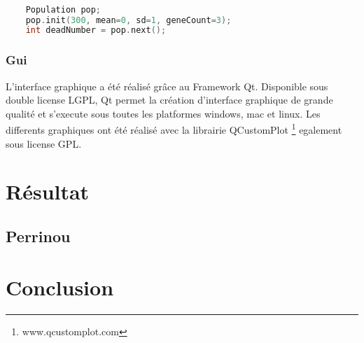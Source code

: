 \documentclass{article}
\begin{document}
	\begin{lstlisting}[language=C++, caption=Generation d'une population et basculement vers la génération suivante, label={code3}]

	Population pop;
	pop.init(300, mean=0, sd=1, geneCount=3); 
	int deadNumber = pop.next();

	\end{lstlisting}

	\subsubsection {Gui}
	L'interface graphique a été réalisé grâce au Framework Qt. Disponible sous double license LGPL, Qt permet la création d'interface graphique de grande qualité et s'execute sous toutes les platformes windows, mac et linux. Les differents graphiques ont été réalisé avec la librairie QCustomPlot \footnote{www.qcustomplot.com} egalement sous license GPL. 


	\section {Résultat}

	\subsection{Perrinou}


	\section {Conclusion}

		
	
\end{document}
